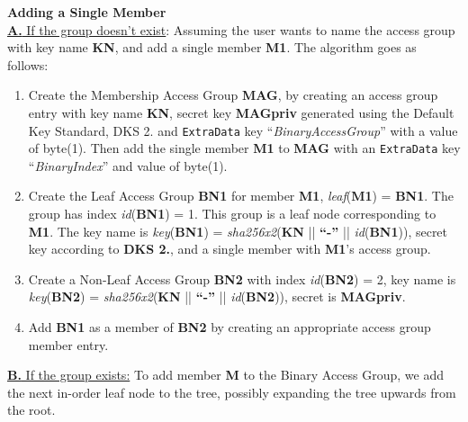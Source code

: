 \documentclass[oneside, 12pt]{article}
\begin{document}
\noindent\textbf{Adding a Single Member}\\
\noindent\underline{\textbf{A.} If the group doesn’t exist}: Assuming the user wants to name the access group with key name \textbf{KN}, and add a single member \textbf{M1}. The algorithm goes as follows:

\begin{enumerate}
  \item Create the Membership Access Group \textbf{MAG}, by creating an access group entry with key name \textbf{KN}, secret key \textbf{MAGpriv} generated using the Default Key Standard, DKS 2. and \texttt{ExtraData} key “\textit{BinaryAccessGroup}” with a value of byte(1). Then add the single member \textbf{M1} to \textbf{MAG} with an \texttt{ExtraData} key “\textit{BinaryIndex}” and value of byte(1).
  \item Create the Leaf Access Group \textbf{BN1} for member \textbf{M1}, \textit{leaf}(\textbf{M1}) = \textbf{BN1}. The group has index \textit{id}(\textbf{BN1}) = 1. This group is a leaf node corresponding to \textbf{M1}. The key name is \textit{key}(\textbf{BN1}) = \textit{sha256x2}(\textbf{KN} || \textbf{“-”} || \textit{id}(\textbf{BN1})), secret key according to \textbf{DKS 2.}, and a single member with \textbf{M1}’s access group.
  \item Create a Non-Leaf Access Group \textbf{BN2} with index \textit{id}(\textbf{BN2}) = 2, key name is \textit{key}(\textbf{BN2}) = \textit{sha256x2}(\textbf{KN} || \textbf{“-”} || \textit{id}(\textbf{BN2})), secret is \textbf{MAGpriv}.
  \item Add \textbf{BN1} as a member of \textbf{BN2} by creating an appropriate access group member entry.
\end{enumerate}

\noindent\underline{\textbf{B.} If the group exists:} To add member \textbf{M} to the Binary Access Group, we add the next in-order leaf node to the tree, possibly expanding the tree upwards from the root.
\end{document}
